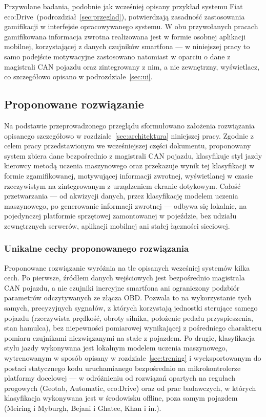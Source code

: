 Przywołane badania, podobnie jak wcześniej opisany przykład systemu Fiat
eco:Drive~(podrozdział~\ref{sec:przeglad}), potwierdzają zasadność zastosowania
gamifikacji w interfejsie opracowywanego systemu. W obu przywołanych pracach
gamifikowana informacja zwrotna realizowana jest w formie osobnej aplikacji mobilnej,
korzystającej z danych czujników smartfona --- w niniejszej pracy to samo podejście
motywacyjne zastosowano natomiast w oparciu o dane z magistrali CAN pojazdu oraz
zintegrowany z nim, a nie zewnętrzny, wyświetlacz, co szczegółowo opisano
w podrozdziale~\ref{sec:ui}.

\subsection{Proponowane rozwiązanie}
\label{sec:proponowane}

Na podstawie przeprowadzonego przeglądu sformułowano założenia rozwiązania opisanego
szczegółowo w rozdziale~\ref{sec:architektura} niniejszej pracy. Zgodnie z celem pracy
przedstawionym we wcześniejszej części dokumentu, proponowany system zbiera dane
bezpośrednio z magistrali CAN pojazdu, klasyfikuje styl jazdy kierowcy metodą uczenia
maszynowego oraz przekazuje wynik tej klasyfikacji w formie zgamifikowanej,
motywującej informacji zwrotnej, wyświetlanej w czasie rzeczywistym na zintegrowanym
z urządzeniem ekranie dotykowym. Całość przetwarzania --- od akwizycji danych, przez
klasyfikację modelem uczenia maszynowego, po generowanie informacji zwrotnej ---
odbywa się lokalnie, na pojedynczej platformie sprzętowej zamontowanej w pojeździe, bez
udziału zewnętrznych serwerów, aplikacji mobilnej ani stałej łączności sieciowej.

\subsubsection{Unikalne cechy proponowanego rozwiązania}

Proponowane rozwiązanie wyróżnia na tle opisanych wcześniej systemów kilka cech.
Po pierwsze, źródłem danych wejściowych jest bezpośrednio magistrala CAN pojazdu, a nie
czujniki inercyjne smartfona ani ograniczony podzbiór parametrów odczytywanych ze
złącza OBD. Pozwala to na wykorzystanie tych samych, precyzyjnych sygnałów, z których
korzystają jednostki sterujące samego pojazdu (rzeczywista prędkość, obroty silnika,
położenie pedału przyspieszenia, stan hamulca), bez niepewności pomiarowej wynikającej
z pośredniego charakteru pomiaru czujnikami niezwiązanymi na stałe z pojazdem. Po
drugie, klasyfikacja stylu jazdy wykonywana jest lokalnym modelem uczenia maszynowego,
wytrenowanym w sposób opisany w rozdziale~\ref{sec:trening} i wyeksportowanym do postaci
statycznego kodu uruchamianego bezpośrednio na mikrokontrolerze platformy docelowej ---
w odróżnieniu od rozwiązań opartych na regułach progowych (Geotab, Automatic, eco:Drive)
oraz od prac badawczych, w których klasyfikacja wykonywana jest w środowisku offline,
poza samym pojazdem (Meiring i Myburgh, Bejani i Ghatee, Khan i in.).

